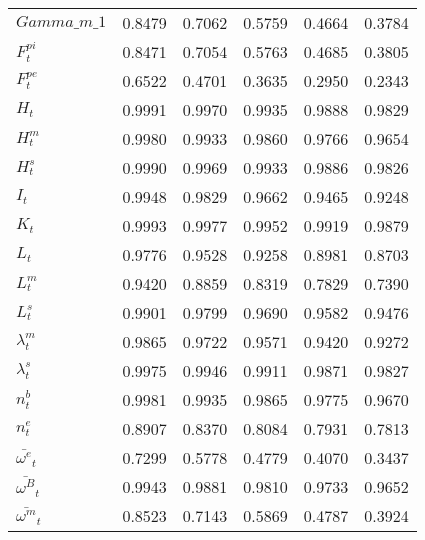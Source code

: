 \begin{center}
\begin{longtable}{lccccc}
$Gamma\_m\_1                $	 & 	    0.8479	 & 	    0.7062	 & 	    0.5759	 & 	    0.4664	 & 	    0.3784 \\ 
$ F^{pi}_t                  $	 & 	    0.8471	 & 	    0.7054	 & 	    0.5763	 & 	    0.4685	 & 	    0.3805 \\ 
$ F^{pe}_t                  $	 & 	    0.6522	 & 	    0.4701	 & 	    0.3635	 & 	    0.2950	 & 	    0.2343 \\ 
$ H_t                       $	 & 	    0.9991	 & 	    0.9970	 & 	    0.9935	 & 	    0.9888	 & 	    0.9829 \\ 
$ H^m_t                     $	 & 	    0.9980	 & 	    0.9933	 & 	    0.9860	 & 	    0.9766	 & 	    0.9654 \\ 
$ H^s_t                     $	 & 	    0.9990	 & 	    0.9969	 & 	    0.9933	 & 	    0.9886	 & 	    0.9826 \\ 
$ I_t                       $	 & 	    0.9948	 & 	    0.9829	 & 	    0.9662	 & 	    0.9465	 & 	    0.9248 \\ 
$ K_t                       $	 & 	    0.9993	 & 	    0.9977	 & 	    0.9952	 & 	    0.9919	 & 	    0.9879 \\ 
$ L_t                       $	 & 	    0.9776	 & 	    0.9528	 & 	    0.9258	 & 	    0.8981	 & 	    0.8703 \\ 
$ L^m_t                     $	 & 	    0.9420	 & 	    0.8859	 & 	    0.8319	 & 	    0.7829	 & 	    0.7390 \\ 
$ L^s_t                     $	 & 	    0.9901	 & 	    0.9799	 & 	    0.9690	 & 	    0.9582	 & 	    0.9476 \\ 
$ \lambda^m_t               $	 & 	    0.9865	 & 	    0.9722	 & 	    0.9571	 & 	    0.9420	 & 	    0.9272 \\ 
$ \lambda^s_t               $	 & 	    0.9975	 & 	    0.9946	 & 	    0.9911	 & 	    0.9871	 & 	    0.9827 \\ 
$ n^b_t                     $	 & 	    0.9981	 & 	    0.9935	 & 	    0.9865	 & 	    0.9775	 & 	    0.9670 \\ 
$ n^e_t                     $	 & 	    0.8907	 & 	    0.8370	 & 	    0.8084	 & 	    0.7931	 & 	    0.7813 \\ 
$ \bar{\omega^e}_t          $	 & 	    0.7299	 & 	    0.5778	 & 	    0.4779	 & 	    0.4070	 & 	    0.3437 \\ 
$ \bar{\omega^B}_t          $	 & 	    0.9943	 & 	    0.9881	 & 	    0.9810	 & 	    0.9733	 & 	    0.9652 \\ 
$ \bar{\omega^m}_t          $	 & 	    0.8523	 & 	    0.7143	 & 	    0.5869	 & 	    0.4787	 & 	    0.3924 \\ 

\end{longtable}
\end{center}
